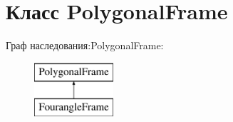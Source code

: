 \hypertarget{class_polygonal_frame}{}\section{Класс Polygonal\+Frame}
\label{class_polygonal_frame}
Граф наследования\+:Polygonal\+Frame\+:\begin{figure}[H]
\begin{center}
\leavevmode
\includegraphics[height=2.000000cm]{class_polygonal_frame}
\end{center}
\end{figure}
